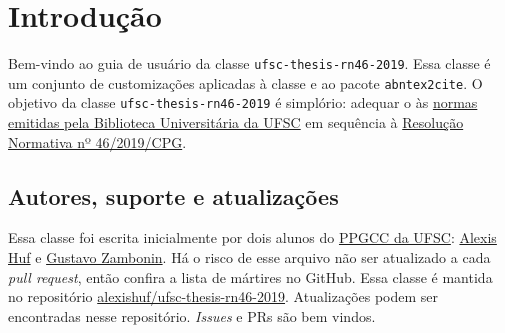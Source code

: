\documentclass[embeddedlogo]{../ufsc-thesis-rn46-2019}
\begin{document}

\pretextual%
\imprimircapa%
\imprimirfolhaderosto*
\protect{}
\imprimirfolhadecertificacao
\clearpage \listoffigures*
\clearpage \tableofcontents*%

\textual%

\chapter{Introdução}

Bem-vindo ao guia de usuário da classe \texttt{ufsc-thesis-rn46-2019}. Essa
classe é um conjunto de customizações aplicadas à classe
\href{https://ctan.org/pkg/abntex2}{\abnTeX} e ao pacote \texttt{abntex2cite}.
O objetivo da classe \texttt{ufsc-thesis-rn46-2019} é simplório: adequar o
\abnTeX{} às \href{http://portal.bu.ufsc.br/normalizacao/}{normas emitidas pela
Biblioteca Universitária da UFSC} em sequência à
\href{https://repositorio.ufsc.br/handle/123456789/197121}{Resolução Normativa
nº 46/2019/CPG}.


\section{Autores, suporte e atualizações}

Essa classe foi escrita inicialmente por dois alunos do
\href{http://ppgcc.posgrad.ufsc.br/}{PPGCC da UFSC}:
\href{mailto:alexishuf@gmail.com}{Alexis Huf} e
\href{mailto:gustavo.zambonin@posgrad.ufsc.br}{Gustavo Zambonin}.  
Há o risco de esse arquivo não ser atualizado a cada \textit{pull request},
então confira a lista de mártires no GitHub. Essa classe é mantida no
repositório
\href{https://github.com/alexishuf/ufsc-thesis-rn46-2019/}{alexishuf/ufsc-thesis-rn46-2019}.
Atualizações podem ser encontradas nesse repositório. \textit{Issues} e PRs são
bem vindos.
\end{document}
